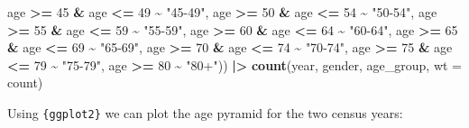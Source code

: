 \documentclass[
]{article}
\newenvironment{Shaded}{\begin{snugshade}}{\end{snugshade}}
\newcommand{\AttributeTok}[1]{\textcolor[rgb]{0.13,0.29,0.53}{#1}}
\newcommand{\DecValTok}[1]{\textcolor[rgb]{0.00,0.00,0.81}{#1}}
\newcommand{\FunctionTok}[1]{\textcolor[rgb]{0.13,0.29,0.53}{\textbf{#1}}}
\newcommand{\NormalTok}[1]{#1}
\newcommand{\SpecialCharTok}[1]{\textcolor[rgb]{0.81,0.36,0.00}{\textbf{#1}}}
\newcommand{\StringTok}[1]{\textcolor[rgb]{0.31,0.60,0.02}{#1}}
\begin{document}
\begin{Shaded}
\begin{Highlighting}[]
\NormalTok{                       age }\SpecialCharTok{\textgreater{}=} \DecValTok{45} \SpecialCharTok{\&}\NormalTok{ age }\SpecialCharTok{\textless{}=} \DecValTok{49} \SpecialCharTok{\textasciitilde{}} \StringTok{"45{-}49"}\NormalTok{,}
\NormalTok{                       age }\SpecialCharTok{\textgreater{}=} \DecValTok{50} \SpecialCharTok{\&}\NormalTok{ age }\SpecialCharTok{\textless{}=} \DecValTok{54} \SpecialCharTok{\textasciitilde{}} \StringTok{"50{-}54"}\NormalTok{,}
\NormalTok{                       age }\SpecialCharTok{\textgreater{}=} \DecValTok{55} \SpecialCharTok{\&}\NormalTok{ age }\SpecialCharTok{\textless{}=} \DecValTok{59} \SpecialCharTok{\textasciitilde{}} \StringTok{"55{-}59"}\NormalTok{,}
\NormalTok{                       age }\SpecialCharTok{\textgreater{}=} \DecValTok{60} \SpecialCharTok{\&}\NormalTok{ age }\SpecialCharTok{\textless{}=} \DecValTok{64} \SpecialCharTok{\textasciitilde{}} \StringTok{"60{-}64"}\NormalTok{,}
\NormalTok{                       age }\SpecialCharTok{\textgreater{}=} \DecValTok{65} \SpecialCharTok{\&}\NormalTok{ age }\SpecialCharTok{\textless{}=} \DecValTok{69} \SpecialCharTok{\textasciitilde{}} \StringTok{"65{-}69"}\NormalTok{,}
\NormalTok{                       age }\SpecialCharTok{\textgreater{}=} \DecValTok{70} \SpecialCharTok{\&}\NormalTok{ age }\SpecialCharTok{\textless{}=} \DecValTok{74} \SpecialCharTok{\textasciitilde{}} \StringTok{"70{-}74"}\NormalTok{,}
\NormalTok{                       age }\SpecialCharTok{\textgreater{}=} \DecValTok{75} \SpecialCharTok{\&}\NormalTok{ age }\SpecialCharTok{\textless{}=} \DecValTok{79} \SpecialCharTok{\textasciitilde{}} \StringTok{"75{-}79"}\NormalTok{,}
\NormalTok{                       age }\SpecialCharTok{\textgreater{}=} \DecValTok{80}             \SpecialCharTok{\textasciitilde{}} \StringTok{"80+"}\NormalTok{)) }\SpecialCharTok{|\textgreater{}}
        \FunctionTok{count}\NormalTok{(year, gender, age\_group, }\AttributeTok{wt =}\NormalTok{ count)}
\end{Highlighting}
\end{Shaded}

Using \texttt{\{ggplot2\}} we can plot the age pyramid for the two
census years:
\end{document}
